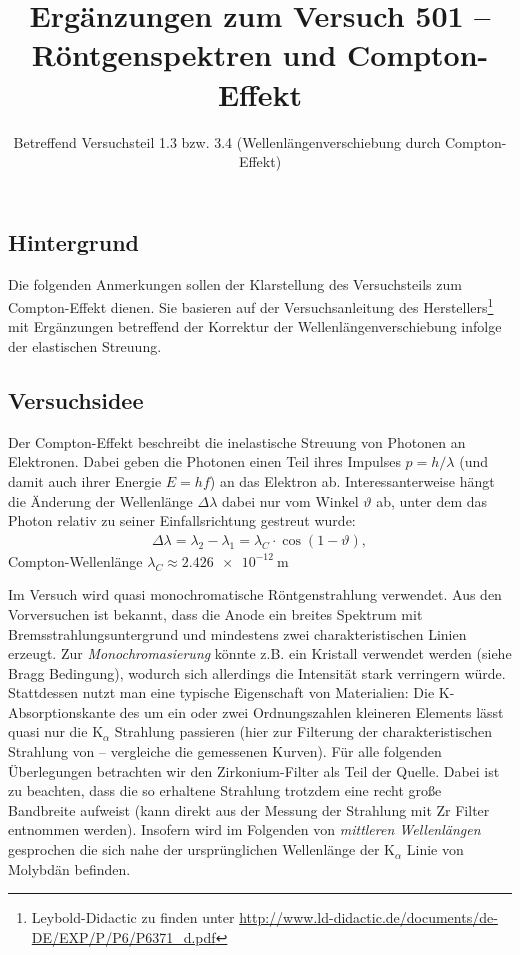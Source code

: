 \documentclass[ngerman,a4paper,twocolumn,twoside]{scrartcl}
\title{Ergänzungen zum Versuch 501 -- Röntgenspektren und Compton-Effekt}
\subtitle{Betreffend Versuchsteil 1.3 bzw. 3.4 (Wellenlängenverschiebung durch Compton-Effekt)}
\begin{document}
\maketitle
\subsection*{Hintergrund}
Die folgenden Anmerkungen sollen der Klarstellung des Versuchsteils zum Compton-Effekt dienen. Sie basieren auf der Versuchsanleitung des Herstellers\footnote{Leybold-Didactic zu finden unter \url{http://www.ld-didactic.de/documents/de-DE/EXP/P/P6/P6371_d.pdf}} mit Ergänzungen betreffend der Korrektur der Wellenlängenverschiebung infolge der elastischen Streuung.
\subsection*{Versuchsidee}
Der Compton-Effekt beschreibt die inelastische Streuung von Photonen an Elektronen. Dabei geben die Photonen einen Teil ihres Impulses $p=h/\lambda$ (und damit auch ihrer Energie $E=hf$) an das Elektron ab. Interessanterweise hängt die Änderung der Wellenlänge $\Delta\lambda$ dabei nur vom Winkel $\vartheta$ ab, unter dem das Photon relativ zu seiner Einfallsrichtung gestreut wurde:
\begin{align}
\Delta\lambda=\lambda_2-\lambda_1=\lambda_C \cdot \cos(1-\vartheta), \label{eq:compton}
\end{align}
Compton-Wellenlänge $\lambda_C\approx\SI{2.426e-12}{\m}$
\par
Im Versuch wird quasi monochromatische Röntgenstrahlung verwendet. Aus den Vorversuchen ist bekannt, dass die Anode ein breites Spektrum mit Bremsstrahlungsuntergrund und mindestens zwei charakteristischen Linien erzeugt. Zur \emph{Monochromasierung} könnte z.B. ein Kristall verwendet werden (siehe Bragg Bedingung), wodurch sich allerdings die Intensität stark verringern würde. Stattdessen nutzt man eine typische Eigenschaft von Materialien: Die K-Absorptionskante des um ein oder zwei Ordnungszahlen kleineren Elements lässt quasi nur die $\mathrm{K}_\alpha$ Strahlung passieren (hier  zur Filterung der charakteristischen Strahlung von   -- vergleiche die gemessenen Kurven). Für alle folgenden Überlegungen betrachten wir den Zirkonium-Filter als Teil der Quelle. Dabei ist zu beachten, dass die so erhaltene Strahlung trotzdem eine recht große Bandbreite aufweist (kann direkt aus der Messung der Strahlung mit Zr Filter entnommen werden). Insofern wird im Folgenden von \emph{mittleren Wellenlängen} gesprochen die sich nahe der ursprünglichen Wellenlänge der $\mathrm{K}_\alpha$ Linie von Molybdän befinden.
\end{document}
